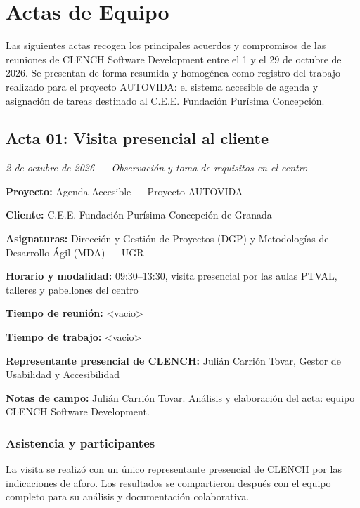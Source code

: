 \newpage
\section{Actas de Equipo}

Las siguientes actas recogen los principales acuerdos y compromisos de las reuniones de CLENCH Software Development entre el 1 y el 29 de octubre de 2026. Se presentan de forma resumida y homogénea como registro del trabajo realizado para el proyecto AUTOVIDA: el sistema accesible de agenda y asignación de tareas destinado al C.E.E. Fundación Purísima Concepción.

\newcommand{\filaAsistente}[2]{#1 & #2 & {\textcolor{clenchCyanDark}{$\checkmark$}} \\
}

\subsection{Acta 01: Visita presencial al cliente}
\textcolor{textGray}{\textit{2 de octubre de 2026 --- Observación y toma de requisitos en el centro}}

\begin{infobox}[title=Datos de la reunión]
\textbf{Proyecto:} Agenda Accesible --- Proyecto AUTOVIDA\par
\textbf{Cliente:} C.E.E. Fundación Purísima Concepción de Granada\par
\textbf{Asignaturas:} Dirección y Gestión de Proyectos (DGP) y Metodologías de Desarrollo Ágil (MDA) --- UGR\par
\textbf{Horario y modalidad:} 09:30--13:30, visita presencial por las aulas PTVAL, talleres y pabellones del centro\par
\textbf{Tiempo de reunión:} <vacio>\par
\textbf{Tiempo de trabajo:} <vacio>\par
\textbf{Representante presencial de CLENCH:} Julián Carrión Tovar, Gestor de Usabilidad y Accesibilidad\par
\textbf{Notas de campo:} Julián Carrión Tovar. Análisis y elaboración del acta: equipo CLENCH Software Development.
\end{infobox}

\subsubsection{Asistencia y participantes}
La visita se realizó con un único representante presencial de CLENCH por las indicaciones de aforo. Los resultados se compartieron después con el equipo completo para su análisis y documentación colaborativa.

